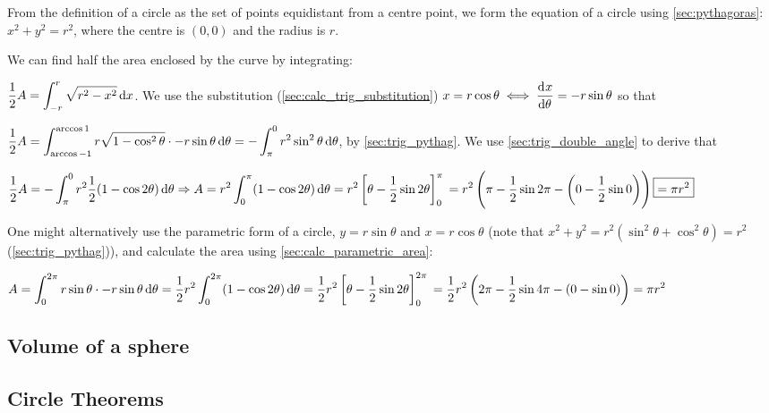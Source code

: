 \documentclass[a4paper,11pt]{article}
\begin{document}

    From the definition of a circle as the set of points equidistant from a
    centre point, we form the equation of a circle using \ref{sec:pythagoras}:
    $x^2 + y^2 = r^2$, where the centre is $(0, 0)$ and the radius is $r$.

    We can find half the area enclosed by the curve by integrating:

    $\displaystyle \frac 12 A = \int_{-r}^r \sqrt{r^2 - x^2} \dif x$. We use the
    substitution (\ref{sec:calc_trig_substitution})
    $x = r \cos \theta \iff \dod x\theta = -r \sin \theta$ so that

    $\displaystyle \frac 12 A = \int_{\arccos -1}^{\arccos 1}
        r\sqrt{1 - \cos^2 \theta} \cdot -r \sin \theta \dif \theta
      = -\int_\pi^0 r^2 \sin^2 \theta \dif \theta$, by \ref{sec:trig_pythag}. We
      use \ref{sec:trig_double_angle} to derive that

    $\displaystyle \frac 12 A = -\int_\pi^0
        r^2 \frac 12 (1 - \cos 2 \theta) \dif \theta \Rightarrow
     A = r^2 \int_0^\pi (1 - \cos 2 \theta) \dif \theta =
     r^2\left[\theta - \frac 12 \sin 2 \theta \right]_0^\pi
     \\= r^2 \left(\pi - \frac 12 \sin 2 \pi -
                   \left(0 - \frac 12 \sin 0\right)\right) \boxed{= \pi r^2}$

    One might alternatively use the parametric form of a circle,
    $y = r \sin \theta$ and $x = r \cos \theta$
    (note that $x^2 + y^2 = r^2(\sin^2 \theta + \cos^2 \theta) = r^2$
    (\ref{sec:trig_pythag})), and calculate the area using
    \ref{sec:calc_parametric_area}:

    $\displaystyle A = \int_0^{2\pi}
        r \sin \theta \cdot -r \sin \theta \dif \theta =
     \frac 12 r^2 \int_0^{2\pi} (1 - \cos 2 \theta) \dif \theta =
     \frac 12 r^2 \left[\theta - \frac 12 \sin 2 \theta\right]_0^{2\pi}
     \\= \frac 12 r^2 \left(2\pi - \frac 12 \sin 4 \pi -
                      \left(0 - \sin 0\right)\right) = \pi r^2$

    \subsection{Volume of a sphere}

    \subsection{Circle Theorems}
\end{document}
